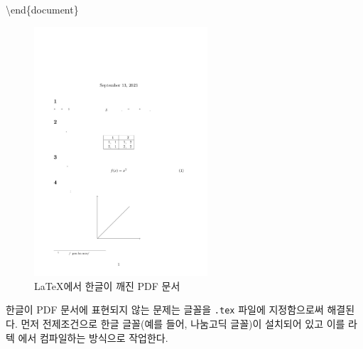 \documentclass[
  letterpaper,
]{book}
\newenvironment{Shaded}{\begin{snugshade}}{\end{snugshade}}
\newcommand{\ExtensionTok}[1]{\textcolor[rgb]{0.00,0.23,0.31}{#1}}
\newcommand{\KeywordTok}[1]{\textcolor[rgb]{0.00,0.23,0.31}{#1}}
\newcommand{\NormalTok}[1]{\textcolor[rgb]{0.00,0.23,0.31}{#1}}
\begin{document}
\begin{Shaded}
\begin{Highlighting}[]
\KeywordTok{\textbackslash{}end}\NormalTok{\{}\ExtensionTok{document}\NormalTok{\}}
\end{Highlighting}
\end{Shaded}

\begin{figure}

{\centering \includegraphics[width=2.54167in,height=\textheight]{images/pdf_korean.jpg}

}

\caption{LaTeX에서 한글이 깨진 PDF 문서}

\end{figure}

한글이 PDF 문서에 표현되지 않는 문제는 글꼴을 \texttt{.tex} 파일에
지정함으로써 해결된다. 먼저 전제조건으로 한글 글꼴(예를 들어, 나눔고딕
글꼴)이 설치되어 있고 이를 라텍 에서 컴파일하는 방식으로 작업한다.
\end{document}
